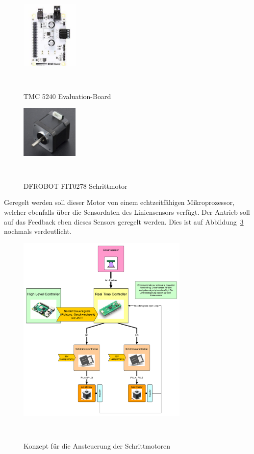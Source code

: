 \documentclass[main.tex]{subfiles} %
\begin{document}
\begin{figure}[h!]
    \centering
    \includegraphics[width=0.25\textwidth]{./fig_Antriebe/TMC_5240_EVAL.png}
    \caption{TMC 5240 Evaluation-Board}~\label{fig:TMC5240_EVAL}
\end{figure}

\begin{figure}[h!]
    \centering
    \includegraphics[width=0.25\textwidth]{./fig_Antriebe/DFRobot_Stepper_FIT0278.png}
    \caption{DFROBOT FIT0278 Schrittmotor}~\label{fig:DFROBOT_FIT0278}
\end{figure}

Geregelt werden soll dieser Motor von einem echtzeitfähigen Mikroprozessor,
welcher ebenfalls über die Sensordaten des Liniensensors verfügt. Der Antrieb
soll auf das Feedback eben dieses Sensors geregelt werden. Dies ist auf
Abbildung~\ref{fig:RTC_Trinamic_Konzept} nochmals verdeutlicht.

\begin{figure}[h!]
    \centering
    \includegraphics[width=0.75\textwidth]{./fig_Antriebe/Konzept_RTC_Trinamic.pdf}
    \caption{Konzept für die Ansteuerung der Schrittmotoren}~\label{fig:RTC_Trinamic_Konzept}
\end{figure}
\end{document}
